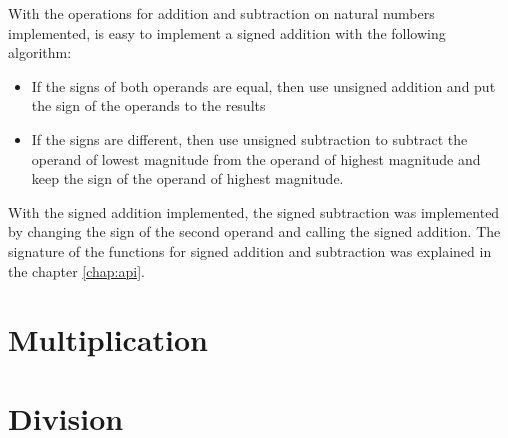 \documentclass{book}
\begin{document}
With the operations for addition and subtraction on natural numbers implemented, is easy to implement a signed addition with the following algorithm:
\begin{itemize}
\item If the signs of both operands are equal, then use unsigned addition and put the sign of the operands to the results
\item If the signs are different, then use unsigned subtraction to subtract the operand of lowest magnitude from the operand of highest magnitude and keep the sign of the operand of highest magnitude.
\end{itemize}

With the signed addition implemented, the signed subtraction was implemented by changing the sign of the second operand and calling the signed addition. The signature of the functions for signed addition and subtraction was explained in the chapter \ref{chap:api}.

\section{Multiplication}

\section{Division}
 
\end{document}
